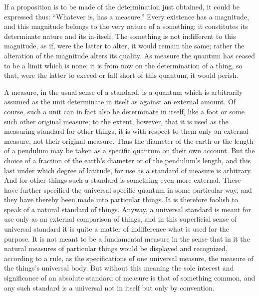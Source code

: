 If a proposition is to be made of the determination just obtained,
it could be expressed thus:
“Whatever is, has a measure.”
Every existence has a magnitude,
and this magnitude belongs to the very nature of a something;
it constitutes its determinate nature and its in-itself.
The something is not indifferent to this magnitude,
as if, were the latter to alter, it would remain the same;
rather the alteration of the magnitude alters its quality.
As measure the quantum has ceased to be a limit which is none;
it is from now on the determination of a thing, so that,
were the latter to exceed or fall short of this quantum,
it would perish.

A measure, in the usual sense of a standard,
is a quantum which is arbitrarily assumed as
the unit determinate in itself as against an external amount.
Of course, such a unit can in fact also be determinate in itself,
like a foot or some such other original measure;
to the extent, however, that it is used as
the measuring standard for other things,
it is with respect to them only an external measure,
not their original measure.
Thus the diameter of the earth or the length of a pendulum
may be taken as a specific quantum on their own account.
But the choice of a fraction of the
earth's diameter
or of the pendulum's length,
and this last under which degree of latitude,
for use as a standard of measure is arbitrary.
And for other things such a standard is
something even more external.
These have further specified
the universal specific quantum in some particular way,
and they have thereby been made into particular things.
It is therefore foolish to speak of a natural standard of things.
Anyway, a universal standard is meant for use
only as an external comparison of things,
and in this superficial sense of universal standard
it is quite a matter of indifference
what is used for the purpose.
It is not meant to be a fundamental measure
in the sense that in it the natural measures
of particular things would be displayed and recognized,
according to a rule, as the specifications of one universal measure,
the measure of the things's universal body.
But without this meaning the sole interest and significance
of an absolute standard of measure is that of something common,
and any such standard is a universal
not in itself but only by convention.

